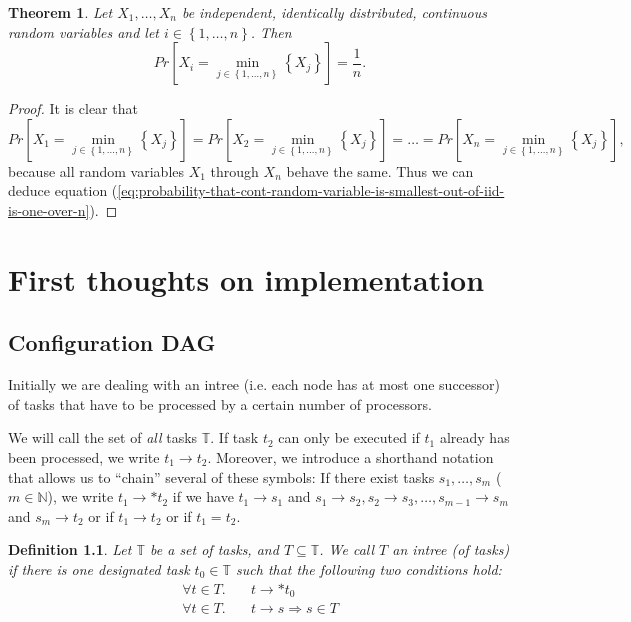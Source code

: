 \documentclass[letter]{report}
\newtheorem{definition}{Definition}[chapter]
\newtheorem{theorem}{Theorem}[chapter]
\newcommand{\p}[1]{Pr\left[#1\right]}
\newcommand{\alltasks}{{\mathbb T}}
\newcommand{\neededfor}{\rightarrow}
\begin{document}
\begin{theorem}
Let $X_1,\dots,X_n$ be independent, identically distributed, continuous random variables and let $i\in\left\{ 1,\dots,n \right\}$. Then 
\begin{equation}
\label{eq:probability-that-cont-random-variable-is-smallest-out-of-iid-is-one-over-n}
\p{X_i = \min_{j\in\left\{ 1,\dots,n \right\}}\left\{ X_j \right\}} = \frac{1}{n}.
\end{equation}
\end{theorem}

\begin{proof}
  It is clear that 
  \begin{equation*}
    \p{X_1 = \min_{j\in\left\{ 1,\dots,n \right\}}\left\{ X_j \right\}} = \p{X_2 = \min_{j\in\left\{ 1,\dots,n \right\}}\left\{ X_j \right\}} = \dots = \p{X_n = \min_{j\in\left\{ 1,\dots,n \right\}}\left\{ X_j \right\}},
  \end{equation*}
because all random variables $X_1$ through $X_n$ behave the same. Thus we can deduce equation (\ref{eq:probability-that-cont-random-variable-is-smallest-out-of-iid-is-one-over-n}).
\end{proof}

\chapter{First thoughts on implementation}
\label{chap:first-thoughts-on-implementation}

\section{Configuration DAG}
\label{sec:configuration-dag}

Initially we are dealing with an intree (i.e. each node has at most one successor) of tasks that have to be processed by a certain number of processors.

We will call the set of \emph{all} tasks $\alltasks$. If task $t_2$ can only be executed if $t_1$ already has been processed, we write $t_1 \neededfor t_2$. Moreover, we introduce a shorthand notation that allows us to ``chain'' several of these symbols: If there exist tasks $s_1,\dots,s_m$ ($m\in\mathbb N$), we write $t_1 \neededfor* t_2$ if we have $t_1 \neededfor s_1$ and $s_1 \neededfor s_2, s_2 \neededfor s_3, \dots, s_{m-1} \neededfor s_m$ and $s_m \neededfor t_2$ or if $t_1\neededfor t_2$ or if $t_1=t_2$.

\begin{definition}
  Let $\alltasks$ be a set of tasks, and $T \subseteq \alltasks$. We call $T$ an intree (of tasks) if there is one designated task $t_0\in\alltasks$ such that the following two conditions hold:
  \begin{eqnarray*}
    \forall  t \in T. & \quad t \neededfor* t_0 \\
    \forall  t \in T. & \quad t\neededfor s \Rightarrow s\in T
  \end{eqnarray*}
\end{definition}
\end{document}
